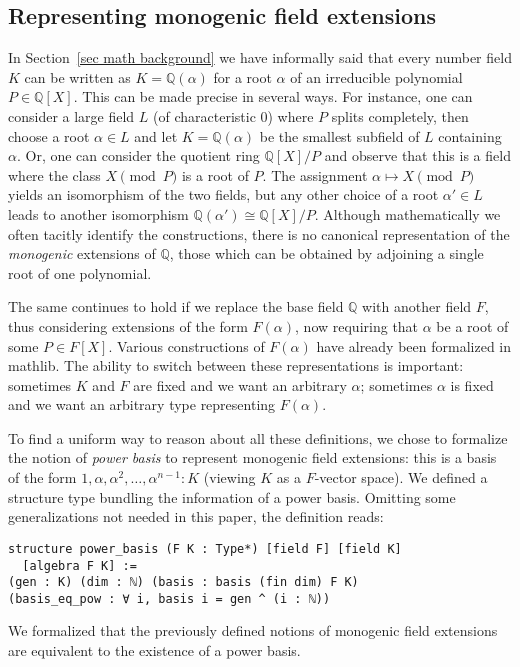 \documentclass[sn-mathphys]{sn-jnl}%
\newcommand{\mathlib}{\textsf{mathlib}\xspace}
\newcommand{\QQ}{\mathbb{Q}}
\begin{document}
\subsection{Representing monogenic field extensions} \label{sec:monogenic-field-extension}

In Section~\ref{sec math background} we have informally said that every number field $K$ can be written as $K=\QQ(\alpha)$ for a root $\alpha$ of an irreducible polynomial $P\in\QQ[X]$. This can be made precise in several ways. For instance, one can consider a large field $L$ (of characteristic $0$) where $P$ splits completely, then choose a root $\alpha\in L$ and let $K = \QQ(\alpha)$ be the smallest subfield of $L$ containing $\alpha$. Or, one can consider the quotient ring $\QQ[X]/P$ and observe that this is a field where the class $X\pmod{P}$ is a root of $P$. The assignment $\alpha\mapsto X\pmod{P}$ yields an isomorphism of the two fields, but any other choice of a root $\alpha'\in L$ leads to another isomorphism $\QQ(\alpha')\cong \QQ[X]/P$. Although mathematically we often tacitly identify the constructions, there is no canonical representation of the \emph{monogenic} extensions of $\QQ$, those which can be obtained by adjoining a single root of one polynomial.

The same continues to hold if we replace the base field $\QQ$ with another field $F$, thus considering extensions of the form $F(\alpha)$, now requiring that $\alpha$ be a root of some $P\in F[X]$. Various constructions of $F(\alpha)$ have already been formalized in \mathlib. The ability to switch between these representations is important: sometimes $K$ and $F$ are fixed and we want an arbitrary $\alpha$; sometimes $\alpha$ is fixed and we want an arbitrary type representing $F(\alpha)$.

To find a uniform way to reason about all these definitions,
we chose to formalize the notion of \emph{power basis} to represent monogenic field extensions: this is a basis of the form $1, \alpha, \alpha^2, \dots, \alpha^{n-1} : K$ (viewing $K$ as a $F$-vector space).
We defined a structure type bundling the information of a power basis.
Omitting some generalizations not needed in this paper, the definition reads:
\begin{lstlisting}
structure power_basis (F K : Type*) [field F] [field K]
  [algebra F K] :=
(gen : K) (dim : ℕ) (basis : basis (fin dim) F K)
(basis_eq_pow : ∀ i, basis i = gen ^ (i : ℕ))
\end{lstlisting}
We formalized that the previously defined notions of monogenic field extensions are equivalent to the existence of a power basis.
\end{document}
